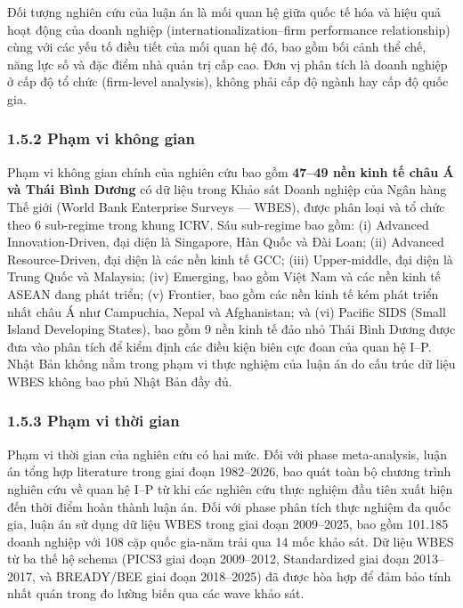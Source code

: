 \documentclass[12pt,a4paper]{article}
\begin{document}
Đối tượng nghiên cứu của luận án là mối quan hệ giữa quốc tế hóa và hiệu
quả hoạt động của doanh nghiệp (internationalization--firm performance
relationship) cùng với các yếu tố điều tiết của mối quan hệ đó, bao gồm
bối cảnh thể chế, năng lực số và đặc điểm nhà quản trị cấp cao. Đơn vị
phân tích là doanh nghiệp ở cấp độ tổ chức (firm-level analysis), không
phải cấp độ ngành hay cấp độ quốc gia.

\hypertarget{152-phux1ea1m-vi-khuxf4ng-gian}{%
\subsubsection{1.5.2 Phạm vi không
gian}\label{152-phux1ea1m-vi-khuxf4ng-gian}}

Phạm vi không gian chính của nghiên cứu bao gồm \textbf{47--49 nền kinh
tế châu Á và Thái Bình Dương} có dữ liệu trong Khảo sát Doanh nghiệp của
Ngân hàng Thế giới (World Bank Enterprise Surveys --- WBES), được phân
loại và tổ chức theo 6 sub-regime trong khung ICRV. Sáu sub-regime bao
gồm: (i) Advanced Innovation-Driven, đại diện là Singapore, Hàn Quốc và
Đài Loan; (ii) Advanced Resource-Driven, đại diện là các nền kinh tế
GCC; (iii) Upper-middle, đại diện là Trung Quốc và Malaysia; (iv)
Emerging, bao gồm Việt Nam và các nền kinh tế ASEAN đang phát triển; (v)
Frontier, bao gồm các nền kinh tế kém phát triển nhất châu Á như
Campuchia, Nepal và Afghanistan; và (vi) Pacific SIDS (Small Island
Developing States), bao gồm 9 nền kinh tế đảo nhỏ Thái Bình Dương được
đưa vào phân tích để kiểm định các điều kiện biên cực đoan của quan hệ
I--P. Nhật Bản không nằm trong phạm vi thực nghiệm của luận án do cấu
trúc dữ liệu WBES không bao phủ Nhật Bản đầy đủ.

\hypertarget{153-phux1ea1m-vi-thux1eddi-gian}{%
\subsubsection{1.5.3 Phạm vi thời
gian}\label{153-phux1ea1m-vi-thux1eddi-gian}}

Phạm vi thời gian của nghiên cứu có hai mức. Đối với phase
meta-analysis, luận án tổng hợp literature trong giai đoạn 1982--2026,
bao quát toàn bộ chương trình nghiên cứu về quan hệ I--P từ khi các
nghiên cứu thực nghiệm đầu tiên xuất hiện đến thời điểm hoàn thành luận
án. Đối với phase phân tích thực nghiệm đa quốc gia, luận án sử dụng dữ
liệu WBES trong giai đoạn 2009--2025, bao gồm 101.185 doanh nghiệp với
108 cặp quốc gia-năm trải qua 14 mốc khảo sát. Dữ liệu WBES từ ba thế hệ
schema (PICS3 giai đoạn 2009--2012, Standardized giai đoạn 2013--2017,
và BREADY/BEE giai đoạn 2018--2025) đã được hòa hợp để đảm bảo tính nhất
quán trong đo lường biến qua các wave khảo sát.
\end{document}
